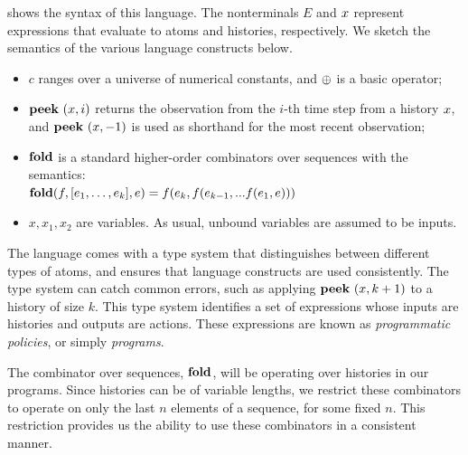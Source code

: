  shows the syntax of this language. The nonterminals $E$ and $x$ represent expressions that evaluate to atoms and histories, respectively. We sketch the semantics of the various language constructs below. 
\begin{itemize}
\item $c$ ranges over a universe of numerical constants, and $\oplus$ is a basic operator;
\item $\mathbf{peek}~(x, i)$ returns the observation from the $i$-th time step from a history $x$, and $\mathbf{peek}~(x, -1)$ is used as shorthand for the most recent observation;
\item $\mathbf{fold}$ is a standard higher-order combinators over sequences with the semantics: \\
 $\mathbf{fold}(f, [e_1, \ldots, e_k], e) = f(e_k, f(e_{k-1}, ... f(e_1, e)))$
\item $x, x_1, x_2$ are variables.
As usual, unbound variables are assumed to be inputs. 
\end{itemize}
The language comes with a type system that distinguishes between different types of atoms, and ensures that language constructs are used consistently. The type system can catch common errors, such as applying $\mathbf{peek}~(x, k+1)$ to a history of size $k$. This type system identifies a set of expressions whose inputs are histories and outputs are actions. These expressions are known as {\em programmatic policies}, or simply {\em programs}. 

The combinator over sequences, $\mathbf{fold}$, will be operating over histories in our programs. Since histories can be of variable lengths, we restrict these combinators to operate on only the last $n$ elements of a sequence, for some fixed $n$. This restriction provides us the ability to use these combinators in a consistent manner.


